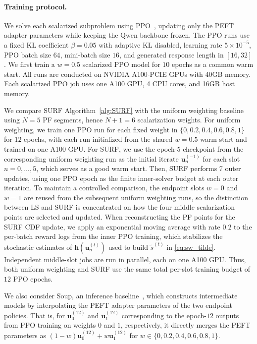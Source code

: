 \documentclass{article}
\newcommand{\bu}{\mathbf{u}}
\newcommand{\h}{\mathbf{h}}
\begin{document}
\paragraph{Training protocol.} 
We solve each scalarized subproblem using PPO~\citep{schulman2017proximal}, updating only the PEFT adapter parameters while keeping the Qwen backbone frozen. 
The PPO runs use a fixed KL coefficient $\beta=0.05$ with adaptive KL disabled, learning rate $5\times 10^{-5}$, PPO batch size $64$, mini-batch size $16$, and generated response length in $[16,32]$. 
We first train a $w=0.5$ scalarized PPO model for $10$ epochs as a common warm start. All runs are conducted on NVIDIA A100-PCIE GPUs with 40GB memory. Each scalarized PPO job uses one A100 GPU, 4 CPU cores, and 16GB host memory.

We compare SURF Algorithm~\ref{alg:SURF} with the uniform weighting baseline using $N=5$ PF segments, hence $N+1=6$ scalarization weights. 
For uniform weighting, we train one PPO run for each fixed weight in $\{0,0.2,0.4,0.6,0.8,1\}$ for $12$ epochs, with each run initialized from the shared $w=0.5$ warm start and trained on one A100 GPU.
For SURF, we use the epoch-$5$ checkpoint from the corresponding uniform weighting run as the initial iterate $\bu_n^{(-1)}$ for each slot $n=0,\ldots,5$, which serves as a good warm start.
Then, SURF performs 7 outer updates, using one PPO epoch as the finite inner-solver budget at each outer iteration. 
To maintain a controlled comparison, the endpoint slots $w=0$ and $w=1$ are reused from the subsequent uniform weighting runs, so the distinction between LS and SURF is concentrated on how the four middle scalarization points are selected and updated. 
When reconstructing the PF points for the SURF CDF update, we apply an exponential moving average with rate $0.2$ to the per-batch reward logs from the inner PPO training, which stabilizes the stochastic estimates of $\h(\bu_n^{(t)})$ used to build $\tilde s^{(t)}$ in \eqref{eq:sw_tilde}. 
Independent middle-slot jobs are run in parallel, each on one A100 GPU.
Thus, both uniform weighting and SURF use the same total per-slot training budget of $12$ PPO epochs. 


We also consider Soup, an inference baseline~\citep{rame2023rewarded}, which constructs intermediate models by interpolating the PEFT adapter parameters of the two endpoint policies. 
That is, for $\bu_0^{(12)}$ and $\bu_1^{(12)}$ corresponding to the epoch-$12$ outputs from PPO training on weights $0$ and $1$, respectively, it directly merges the PEFT parameters as $(1-w)\bu_0^{(12)}+w\bu_1^{(12)}$ for $w\in \{0,0.2,0.4,0.6,0.8,1\}$.
\end{document}
